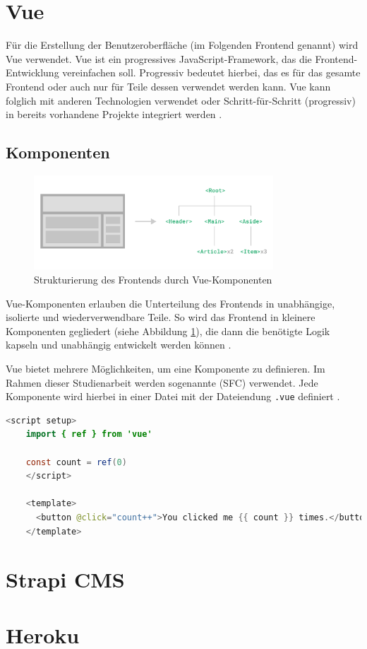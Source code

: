%
%
\section{Vue}

Für die Erstellung der Benutzeroberfläche (im Folgenden \glqq Frontend\grqq{} genannt) wird Vue verwendet. Vue ist ein progressives JavaScript-Framework, das die Frontend-Entwicklung vereinfachen soll. Progressiv bedeutet hierbei, das es für das gesamte Frontend oder auch nur für Teile dessen verwendet werden kann. Vue kann folglich mit anderen Technologien verwendet oder Schritt-für-Schritt (progressiv) in bereits vorhandene Projekte integriert werden \cite[vgl.][]{VueIntroduction}.

\subsection{Komponenten}
\begin{figure}[H]
  \includegraphics[width=0.8\textwidth]{images/vue-components.png}
  \centering
  \caption[Vue-Komponenten]{Strukturierung des Frontends durch Vue-Komponenten \cite{VueComponentBasics}}
  \label{fig:vue-components}
\end{figure}

Vue-Komponenten erlauben die Unterteilung des Frontends in unabhängige, isolierte und wiederverwendbare Teile. So wird das Frontend in kleinere Komponenten gegliedert (siehe Abbildung \ref{fig:vue-components}), die dann die benötigte Logik kapseln und unabhängig entwickelt werden können \cite[vgl.][]{VueComponentBasics}.

Vue bietet mehrere Möglichkeiten, um eine Komponente zu definieren. Im Rahmen dieser Studienarbeit werden sogenannte  (\acs{SFC}) verwendet. Jede Komponente wird hierbei in einer Datei mit der Dateiendung \lstinline{.vue} definiert \cite[vgl.][]{VueComponentBasics}.

\vspace{2\parskip}
\begin{minipage}{\linewidth}
  \begin{lstlisting}[language=java, frame=single, label=lst:vue-component, caption=Beispiel einer Vue \ac{SFC}]
    <script setup>
    import { ref } from 'vue'

    const count = ref(0)
    </script>

    <template>
      <button @click="count++">You clicked me {{ count }} times.</button>
    </template>
  \end{lstlisting}
\end{minipage}

%
%
\section{Strapi CMS}

%
%
\section{Heroku}
